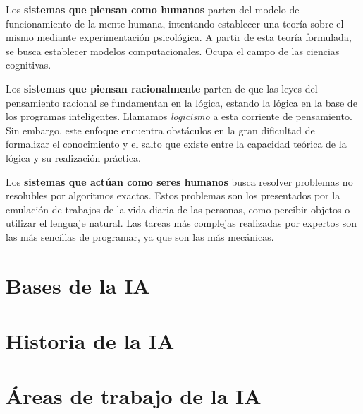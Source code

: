 Los \textbf{sistemas que piensan como humanos} parten del modelo de funcionamiento de la mente humana, intentando establecer una teoría sobre el mismo mediante experimentación psicológica.
A partir de esta teoría formulada, se busca establecer modelos computacionales.
Ocupa el campo de las ciencias cognitivas.

Los \textbf{sistemas que piensan racionalmente} parten de que las leyes del pensamiento racional se fundamentan en la lógica, estando la lógica en la base de los programas inteligentes.
Llamamos \textit{logicismo} a esta corriente de pensamiento.
Sin embargo, este enfoque encuentra obstáculos en la gran dificultad de formalizar el conocimiento y el salto que existe entre la capacidad teórica de la lógica y su realización práctica.

Los \textbf{sistemas que actúan como seres humanos} busca resolver problemas no resolubles por algoritmos exactos.
Estos problemas son los presentados por la emulación de trabajos de la vida diaria de las personas, como percibir objetos o utilizar el lenguaje natural.
Las tareas más complejas realizadas por expertos son las más sencillas de programar, ya que son las más mecánicas.

\section{Bases de la IA}

\section{Historia de la IA}

\section{Áreas de trabajo de la IA}

